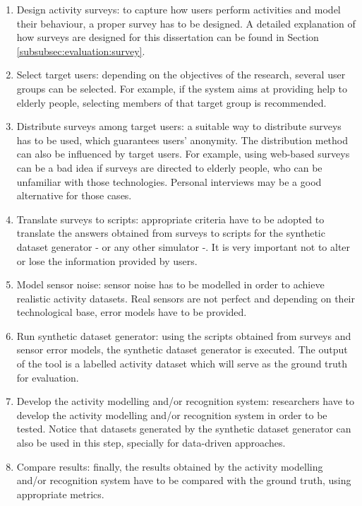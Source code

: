 \begin{enumerate}
 \item Design activity surveys: to capture how users perform activities and model their behaviour, a proper survey has to be designed. A detailed explanation of how surveys are designed for this dissertation can be found in Section \ref{subsubsec:evaluation:survey}.
 \item Select target users: depending on the objectives of the research, several user groups can be selected. For example, if the system aims at providing help to elderly people, selecting members of that target group is recommended.
 \item Distribute surveys among target users: a suitable way to distribute surveys has to be used, which guarantees users' anonymity. The distribution method can also be influenced by target users. For example, using web-based surveys can be a bad idea if surveys are directed to elderly people, who can be unfamiliar with those technologies. Personal interviews may be a good alternative for those cases.
 \item Translate surveys to scripts: appropriate criteria have to be adopted to translate the answers obtained from surveys to scripts for the synthetic dataset generator - or any other simulator -. It is very important not to alter or lose the information provided by users.
 \item Model sensor noise: sensor noise has to be modelled in order to achieve realistic activity datasets. Real sensors are not perfect and depending on their technological base, error models have to be provided.
 \item Run synthetic dataset generator: using the scripts obtained from surveys and sensor error models, the synthetic dataset generator is executed. The output of the tool is a labelled activity dataset which will serve as the ground truth for evaluation.
 \item Develop the activity modelling and/or recognition system: researchers have to develop the activity modelling and/or recognition system in order to be tested. Notice that datasets generated by the synthetic dataset generator can also be used in this step, specially for data-driven approaches.
 \item Compare results: finally, the results obtained by the activity modelling and/or recognition system have to be compared with the ground truth, using appropriate metrics.
\end{enumerate}

